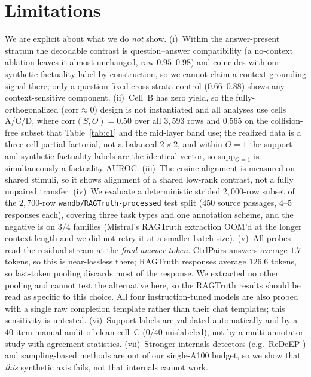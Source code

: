 \section*{Limitations}
We are explicit about what we do \emph{not} show. (i)~Within the answer-present stratum
the decodable contrast is question--answer compatibility (a no-context ablation leaves
it almost unchanged, raw $0.95$--$0.98$) and coincides with our synthetic factuality
label by construction, so we cannot claim a context-grounding signal there; only a
question-fixed cross-strata control ($0.66$--$0.88$) shows any context-sensitive
component. (ii)~Cell~B has zero yield, so the fully-orthogonalized
($\mathrm{corr}{\approx}0$) design is not instantiated and all analyses use cells A/C/D,
where $\mathrm{corr}(S,O){=}0.50$ over all $3{,}593$ rows and $0.565$ on the
collision-free subset that Table~\ref{tab:c1} and the mid-layer band use; the realized
data is a three-cell partial factorial, not a balanced $2\times2$, and within $O{=}1$
the support and synthetic factuality labels are the identical vector, so
supp$_{O=1}$ is simultaneously a factuality AUROC. (iii)~The cosine alignment is
measured on shared stimuli, so it shows alignment of a shared low-rank contrast, not a
fully unpaired transfer. (iv)~We evaluate a deterministic strided $2{,}000$-row subset
of the $2{,}700$-row \texttt{wandb/RAGTruth-processed} test split ($450$ source
passages, $4$--$5$ responses each), covering three task types and one annotation
scheme, and the negative is on $3/4$ families (Mistral's RAGTruth extraction OOM'd at
the longer context length and we did not retry it at a smaller batch size).
(v)~All probes read the residual stream at the \emph{final answer token}. CtrlPairs
answers average $1.7$ tokens, so this is near-lossless there; RAGTruth responses
average $126.6$ tokens, so last-token pooling discards most of the response. We
extracted no other pooling and cannot test the alternative here, so the RAGTruth
results should be read as specific to this choice. All four
instruction-tuned models are also probed with a single raw completion template rather
than their chat templates; this sensitivity is untested. (vi)~Support labels are validated
automatically and by a $40$-item manual audit of clean cell~C ($0/40$ mislabeled), not
by a multi-annotator study with agreement statistics. (vii)~Stronger internals
detectors (e.g.\ ReDeEP \citep{sun2025redeep}) and sampling-based methods
\citep{manakul2023selfcheckgpt} are out of
our single-A100 budget, so we show that \emph{this} synthetic axis fails, not that
internals cannot work.

